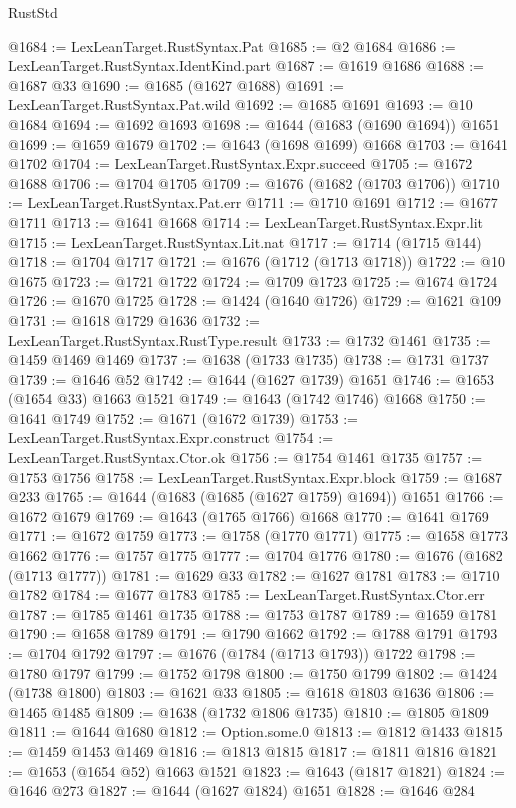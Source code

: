 \begin{lexlean}{RustStd}
\begin{coremodule}
@1684 := LexLeanTarget.RustSyntax.Pat
@1685 := @2 @1684
@1686 := LexLeanTarget.RustSyntax.IdentKind.part
@1687 := @1619 @1686
@1688 := @1687 @33
@1690 := @1685 (@1627 @1688)
@1691 := LexLeanTarget.RustSyntax.Pat.wild
@1692 := @1685 @1691
@1693 := @10 @1684
@1694 := @1692 @1693
@1698 := @1644 (@1683 (@1690 @1694)) @1651
@1699 := @1659 @1679
@1702 := @1643 (@1698 @1699) @1668
@1703 := @1641 @1702
@1704 := LexLeanTarget.RustSyntax.Expr.succeed
@1705 := @1672 @1688
@1706 := @1704 @1705
@1709 := @1676 (@1682 (@1703 @1706))
@1710 := LexLeanTarget.RustSyntax.Pat.err
@1711 := @1710 @1691
@1712 := @1677 @1711
@1713 := @1641 @1668
@1714 := LexLeanTarget.RustSyntax.Expr.lit
@1715 := LexLeanTarget.RustSyntax.Lit.nat
@1717 := @1714 (@1715 @144)
@1718 := @1704 @1717
@1721 := @1676 (@1712 (@1713 @1718))
@1722 := @10 @1675
@1723 := @1721 @1722
@1724 := @1709 @1723
@1725 := @1674 @1724
@1726 := @1670 @1725
@1728 := @1424 (@1640 @1726)
@1729 := @1621 @109
@1731 := @1618 @1729 @1636
@1732 := LexLeanTarget.RustSyntax.RustType.result
@1733 := @1732 @1461
@1735 := @1459 @1469 @1469
@1737 := @1638 (@1733 @1735)
@1738 := @1731 @1737
@1739 := @1646 @52
@1742 := @1644 (@1627 @1739) @1651
@1746 := @1653 (@1654 @33) @1663 @1521
@1749 := @1643 (@1742 @1746) @1668
@1750 := @1641 @1749
@1752 := @1671 (@1672 @1739)
@1753 := LexLeanTarget.RustSyntax.Expr.construct
@1754 := LexLeanTarget.RustSyntax.Ctor.ok
@1756 := @1754 @1461 @1735
@1757 := @1753 @1756
@1758 := LexLeanTarget.RustSyntax.Expr.block
@1759 := @1687 @233
@1765 := @1644 (@1683 (@1685 (@1627 @1759) @1694)) @1651
@1766 := @1672 @1679
@1769 := @1643 (@1765 @1766) @1668
@1770 := @1641 @1769
@1771 := @1672 @1759
@1773 := @1758 (@1770 @1771)
@1775 := @1658 @1773 @1662
@1776 := @1757 @1775
@1777 := @1704 @1776
@1780 := @1676 (@1682 (@1713 @1777))
@1781 := @1629 @33
@1782 := @1627 @1781
@1783 := @1710 @1782
@1784 := @1677 @1783
@1785 := LexLeanTarget.RustSyntax.Ctor.err
@1787 := @1785 @1461 @1735
@1788 := @1753 @1787
@1789 := @1659 @1781
@1790 := @1658 @1789
@1791 := @1790 @1662
@1792 := @1788 @1791
@1793 := @1704 @1792
@1797 := @1676 (@1784 (@1713 @1793)) @1722
@1798 := @1780 @1797
@1799 := @1752 @1798
@1800 := @1750 @1799
@1802 := @1424 (@1738 @1800)
@1803 := @1621 @33
@1805 := @1618 @1803 @1636
@1806 := @1465 @1485
@1809 := @1638 (@1732 @1806 @1735)
@1810 := @1805 @1809
@1811 := @1644 @1680
@1812 := Option.some.{0}
@1813 := @1812 @1433
@1815 := @1459 @1453 @1469
@1816 := @1813 @1815
@1817 := @1811 @1816
@1821 := @1653 (@1654 @52) @1663 @1521
@1823 := @1643 (@1817 @1821)
@1824 := @1646 @273
@1827 := @1644 (@1627 @1824) @1651
@1828 := @1646 @284

\end{coremodule}
\end{lexlean}
